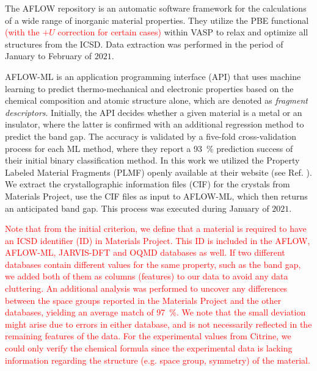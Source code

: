 \documentclass[superscriptaddress,unsortedaddress,
 amsmath,amssymb,
 aps,
]{revtex4-2}
\newcommand{\mrk}[1]{\textcolor{red}{#1}}
\begin{document}
The AFLOW \cite{Curtarolo2012, Curtarolo2012a, Calderon2015} repository is an automatic software framework for the calculations of a wide range of inorganic material properties. They utilize the PBE functional \mrk{(with the $+U$ correction for certain cases)} within VASP to relax and optimize all structures from the ICSD. Data extraction was performed in the period of January to February of $2021$.

AFLOW-ML \cite{Isayev2017} is an application programming interface (API) that uses machine learning to predict thermo-mechanical and electronic properties based on the chemical composition and atomic structure alone, which are denoted as \textit{fragment descriptors}. Initially, the API decides whether a given material is a metal or an insulator, where the latter is confirmed with an additional regression method to predict the band gap. The accuracy is validated by a five-fold cross-validation process for each ML method, where they report a \SI{93}{\percent} prediction success of their initial binary classification method. In this work we utilized the Property Labeled Material Fragments (PLMF) openly available at their website 
(see Ref. \cite{Isayev2017}). 
We extract the crystallographic information files (CIF) for the crystals from Materials Project, use the CIF files as input to AFLOW-ML, which then returns an anticipated band gap. This process was executed during January of $2021$. 

\mrk{Note that from the initial criterion, we define that a material is required to have an ICSD identifier (ID) in Materials Project. This ID is included in the AFLOW,  AFLOW-ML, JARVIS-DFT and OQMD databases as well. If two different databases contain different values for the same property, such as the band gap, we added both of them as columns (features) to our data to avoid any data cluttering. An additional analysis was performed to uncover any differences between the space groups reported in the Materials Project and the other databases, yielding an average match of \SI{97}{\percent}. We note that the small deviation might arise due to errors in either database, and is not necessarily reflected in the remaining features of the data. For the experimental values from Citrine, we could only verify the chemical formula since the experimental data is lacking information regarding the structure (e.g. space group, symmetry) of the material.}
\end{document}
